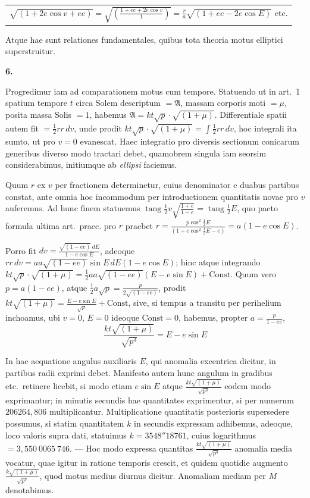 \documentclass[12pt,a4paper]{book}
\newcommand{\tang}{\operatorname{tang}}
\newcommand{\Const}{\mathrm{Const}}
\begin{document}
\begin{center}
\begin{tabular}{@{}l@{}}
$\sqrt{(1+2e\cos v+ee)}=\sqrt{\left(\frac{1+ee+2e\cos v}{1}\right)}=\frac{r}{a}\sqrt{(1+ee-2e\cos E)}$ etc.
\end{tabular}
\end{center}

Atque hae sunt relationes fundamentales, quibus tota theoria motus elliptici superstruitur.

\textbf{6.}

Progredimur iam ad comparationem motus cum tempore. Statuendo ut in art.~1 spatium tempore $t$ circa Solem descriptum $=\mathfrak{A}$, massam corporis moti $=\mu$, posita massa Solis $=1$, habemus $\mathfrak{A}=kt\sqrt{p}\cdot\sqrt{(1+\mu)}$. Differentiale spatii autem fit $=\tfrac{1}{2}rr\,dv$, unde prodit $kt\sqrt{p}\cdot\sqrt{(1+\mu)}=\int\tfrac{1}{2}rr\,dv$, hoc integrali ita sumto, ut pro $v=0$ evanescat. Haec integratio pro diversis sectionum conicarum generibus diverso modo tractari debet, quamobrem singula iam seorsim considerabimus, initiumque ab \textit{ellipsi} faciemus.

Quum $r$ ex $v$ per fractionem determinetur, cuius denominator e duabus partibus constat, ante omnia hoc incommodum per introductionem quantitatis novae pro $v$ auferemus. Ad hunc finem statuemus $\tang\tfrac{1}{2}v\sqrt{\frac{1+e}{1-e}}=\tang\tfrac{1}{2}E$, quo pacto formula ultima art.~praec. pro $r$ praebet $r=\frac{p\cos^{2}\tfrac{1}{2}E}{(1+e\cos^{2}\tfrac{1}{2}E-e)}=a(1-e\cos E)$.

Porro fit $dv=\frac{\sqrt{(1-ee)}\,dE}{1-e\cos E}$, adeoque $rr\,dv=aa\sqrt{(1-ee)}\sin E\,dE(1-e\cos E)$; hinc atque integrando $kt\sqrt{p}\cdot\sqrt{(1+\mu)}=\tfrac{1}{2}aa\sqrt{(1-ee)}(E-e\sin E)+\Const$. Quum vero $p=a(1-ee)$, atque $\tfrac{1}{2}a\sqrt{p}=\tfrac{p}{2\sqrt{(1-ee)}}$, prodit $kt\sqrt{(1+\mu)}=\frac{E-e\sin E}{\sqrt{p}}+\Const$, sive, si tempus a transitu per perihelium inchoamus, ubi $v=0$, $E=0$ ideoque $\Const=0$, habemus, propter $a=\frac{p}{1-ee}$,
\[
\frac{kt\sqrt{(1+\mu)}}{\sqrt{p^{3}}}=E-e\sin E
\]

In hac aequatione angulus auxiliaris $E$, qui anomalia excentrica dicitur, in partibus radii exprimi debet. Manifesto autem hunc angulum in gradibus etc.~retinere licebit, si modo etiam $e\sin E$ atque $\frac{kt\sqrt{(1+\mu)}}{\sqrt{p^{3}}}$ eodem modo exprimantur; in minutis secundis hae quantitates exprimentur, si per numerum $206264{,}806$ multiplicantur. Multiplicatione quantitatis posterioris supersedere possumus, si statim quantitatem $k$ in secundis expressam adhibemus, adeoque, loco valoris supra dati, statuimus $k=3548{''}18761$, cuius logarithmus $=3{,}550\ 0065\ 746$. --- Hoc modo expressa quantitas $\frac{kt\sqrt{(1+\mu)}}{\sqrt{p^{3}}}$ anomalia media vocatur, quae igitur in ratione temporis crescit, et quidem quotidie augmento $\frac{k\sqrt{(1+\mu)}}{\sqrt{p^{3}}}$, quod motus medius diurnus dicitur. Anomaliam mediam per $M$ denotabimus.
\end{document}
